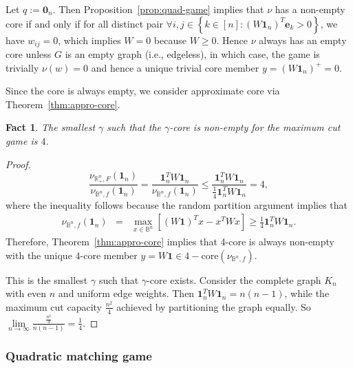 \documentclass[11pt]{article}\usepackage[]{graphicx}\usepackage[]{xcolor}
\newtheorem{fact}{Fact}
\begin{document}
\begin{enumerate}[(i)]
Let $q:=\mathbf{0}_n$. Then Proposition~\ref{prop:quad-game} implies that $\nu$ has a non-empty core if and only if for all distinct pair $\forall i, j\in \left\{k\in [n]: (W\mathbf{1}_n)^T\mathbf{e}_k>0\right\}$, we have $w_{ij}=0$, which implies $W=0$ because $W\ge 0$. Hence $\nu$ always has an empty core unless $G$ is an empty graph (i.e., edgeless), in which case, the game is trivially $\nu(w)=0$ and hence a unique trivial core member $y=(W\mathbf{1}_n)^{+}=0$.

Since the core is always empty, we consider approximate core via Theorem~\ref{thm:appro-core}.
\begin{fact} The smallest $\gamma$ such that the $\gamma$-core is non-empty for the maximum cut game is $4$.
\end{fact}
\begin{proof}
\[
\frac{\nu_{\mathbb{R}^n_{+}, F}\left(\mathbf{1}_n\right)}{\nu_{\mathbb{B}^n, f}\left(\mathbf{1}_n\right)}=\frac{\mathbf{1}_n^TW\mathbf{1}_n}{\nu_{\mathbb{B}^n, f}\left(\mathbf{1}_n\right)}\le\frac{\mathbf{1}_n^TW\mathbf{1}_n}{\frac{1}{4} \mathbf{1}_n^TW\mathbf{1}_n}=4,
\]
where the inequality follows because the random partition argument implies that
\begin{eqnarray*}
\nu_{\mathbb{B}^n, f}\left(\mathbf{1}_n\right)&=&\max\limits_{x\in\mathbb{B}^n} \left[(W\mathbf{1})^Tx-x^TWx \right]\ge \frac{1}{4} \mathbf{1}_n^TW\mathbf{1}_n.
\end{eqnarray*}
Therefore, Theorem~\ref{thm:appro-core} implies that 4-core is always non-empty with the unique $4$-core member $y=W\mathbf{1}\in 4-\text{core}(\nu_{\mathbb{B}^n, f})$. 

This is the smallest $\gamma$ such that $\gamma$-core exists. Consider the complete graph $K_n$ with even $n$ and uniform edge weights. Then $\mathbf{1}_n^TW\mathbf{1}_n=n(n-1)$, while the maximum cut capacity $\frac{n^2}{4}$ achieved by partitioning the graph equally. So $\lim\limits_{n\to\infty} \frac{\frac{n^2}{4}}{n(n-1)}=\frac{1}{4}$. 
\end{proof}


\end{enumerate}



\subsubsection{Quadratic matching game}
\end{document}
